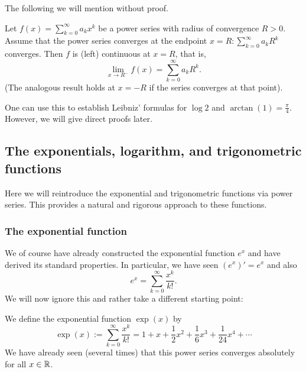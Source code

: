 \documentclass[10pt, a4paper]{article}
\newcommand{\infsumo}[1][k = 0]{\sum_{#1}^{\infty}}
\begin{document}
The following we will mention without proof.
\begin{theorem}
    Let $f(x) = \infsumo a_kx ^ k$ be a power series with radius of convergence $R > 0$.
    Assume that the power series converges at the endpoint $x = R: \infsumo a_kR ^ k$ converges.
    Then $f$ is
    (left)
    continuous at $x = R$,
    that is,
    \[
    \lim_{x \rightarrow R ^ {-}}f(x) = \infsumo a_kR ^ k.
    \]
    (The analogous result holds at $x = -R$ if the series converges at that point).
\end{theorem}

One can use this to establish Leibniz' formulas for $\log{2}$ and $\arctan(1) = \frac{\pi}{4}$.
However,
we will give direct proofs later.

\subsection{The exponentials, logarithm, and trigonometric functions}
Here we will reintroduce the exponential and trigonometric functions via power series.
This provides a natural and rigorous approach to these functions.

\subsubsection{The exponential function}
We of course have already constructed the exponential function $e ^ x$ and have derived its standard properties.
In particular,
we have seen $(e ^ x)' = e ^ x$ and also
\[
e ^ x = \infsumo\frac{x ^ k}{k!}.
\]
We will now ignore this and rather take a different starting point:
\begin{definition}
    We define the exponential function $\exp(x)$ by
    \[
    \exp(x) := \infsumo\frac{x ^ k}{k!} = 1 + x + \frac{1}{2}x ^ 2 + \frac{1}{6}x ^ 3 + \frac{1}{24}x ^ 4 + \dotsi
    \]
    We have already seen
    (several times)
    that this power series converges absolutely for all $x \in \mathbb{R}$.
\end{definition}
\end{document}
